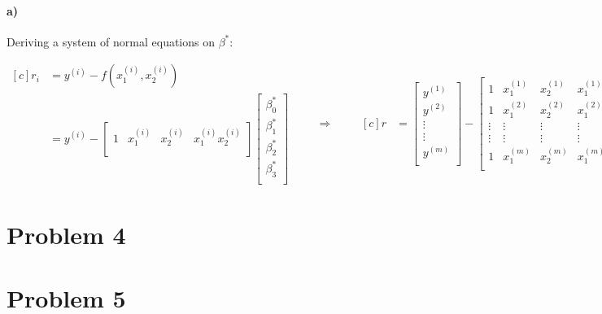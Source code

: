\documentclass[10pt,letter]{article}
\begin{document}
\paragraph{a)} Deriving a system of normal equations on $\beta^*$:

\begin{equation*}
\begin{aligned}[c]
r_i &= y^{(i)} - f(x_1^{(i)}, x_2^{(i)})
\\ &= y^{(i)} - 
\left[ {\begin{array}{cccc}
 1 & x_1^{(i)} & x_2^{(i)} & x_1^{(i)} x_2^{(i)} \\
\end{array} } \right]
\left[ {\begin{array}{c}
\beta^*_0 \\
\beta^*_1 \\
\beta^*_2 \\
\beta^*_3 \\
\end{array} } \right]
\end{aligned}
\qquad\Rightarrow\qquad
\begin{aligned}[c]
r &=  
\left[ {\begin{array}{c}
y^{(1)} \\
y^{(2)} \\
\vdots \\
\vdots \\
y^{(m)} \\
\end{array} } \right]
-
\left[ {\begin{array}{cccc}
 1 & x_1^{(1)} & x_2^{(1)} & x_1^{(1)} x_2^{(1)} \\
 1 & x_1^{(2)} & x_2^{(2)} & x_1^{(2)} x_2^{(2)} \\
 \vdots & \vdots & \vdots & \vdots \\
 \vdots & \vdots & \vdots & \vdots \\
 1 & x_1^{(m)} & x_2^{(m)} & x_1^{(m)} x_2^{(m)} \\
\end{array} } \right]
\left[ {\begin{array}{c}
\beta^*_0 \\
\beta^*_1 \\
\beta^*_2 \\
\beta^*_3 \\
\end{array} } \right]
\end{aligned}
\end{equation*}

\section*{Problem 4}

\section*{Problem 5}
\end{document}
